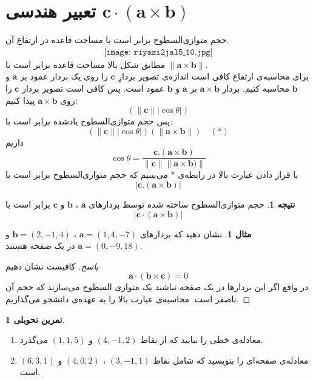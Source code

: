 \documentclass[12pt,a4paper]{article}
\theoremstyle{definition}
\newtheorem{mesal}[thm]{مثال}
\newtheorem{cor}[thm]{نتیجه}
\newtheorem{tamrinetahvili}{تمرین تحویلی}
\begin{document}
\section*{تعبیر هندسی $\mathbf{c} \cdot (\mathbf{a} \times \mathbf{b})$}
حجم متوازی‌السطوح برابر است با مساحت قاعده در ارتفاع آن.
\begin{align*}
\texttt{[image: riyazi2jal5\_10.jpg]}
\end{align*}
مطابق شکل بالا مساحت قاعده برابر است با
$\|\mathbf{a} \times \mathbf{b}\|$.
\\
برای محاسبه‌ی ارتفاع کافی است اندازه‌ی تصویر بردارِ 
$\mathbf{c}$
را روی یک بردار عمود بر 
$\mathbf{a}$
و 
$\mathbf{b}$
محاسبه کنیم.
بردار 
$\mathbf{a} \times \mathbf{b}$
بر 
$\mathbf{a}$
و 
$\mathbf{b}$
عمود است.
پس کافی است تصویر بردار
$\mathbf{c}$
را روی 
$\mathbf{a} \times \mathbf{b}$
پیدا کنیم:
\[
(\|\mathbf{c} \| |\cos \theta|)
\]
پس حجم متوازی‌السطوح یادشده برابر است با:
\[
(\|\mathbf{c} \| |\cos \theta|) (\|\mathbf{a} \times \mathbf{b}\|) \quad (*)
\]
داریم
\[
\cos \theta= \frac{\mathbf{c}.(\mathbf{a}\times\mathbf{b})}{\|\mathbf{c}\|\|\mathbf{a}\times\mathbf{b})\|}
\]
با قرار دادن عبارت بالا در رابطه‌ی
$*$
می‌بینیم که 
حجم متوازی‌السطوح برابر است با
\[|\mathbf{c}.(\mathbf{a}\times \mathbf{b})|\]
\begin{cor}
حجم متوازی‌السطوح ساخته شده توسط بردارهای 
$\mathbf{a}$
،
$\mathbf{b}$
و
$\mathbf{c}$
برابر است با
\[
|\mathbf{c}\cdot (\mathbf{a} \times \mathbf{b})|
\]
\end{cor}
\begin{mesal}
نشان دهید که بردارهای 
$\mathbf{a}=(1,4,-7)$
،
$\mathbf{b}=(2,-1,4)$
و
$\mathbf{a}=(0,-9,18)$
در یک صفحه هستند.
\end{mesal}
\begin{proof}[پاسخ]
کافیست نشان دهیم 
\[
\mathbf{a}\cdot (\mathbf{b} \times \mathbf{c})=0
\]
در واقع اگر این بردارها در یک صفحه نباشند یک متوازی السطوح می‌سازند که حجم آن ناصفر است. محاسبه‌ی عبارت بالا را به عهده‌ی دانشجو می‌گذاریم. 
\end{proof}
\begin{tamrinetahvili}
\hfill
\begin{enumerate}
\item
معادله‌ی خطی را بیابید که از نقاط 
$(4,-1,2)$
و
$(1,1,5)$
می‌گذرد.
\item
معادله‌ی صفحه‌ای را بنویسید که شامل نقاط 
$(3,-1,1)$
،
$(4,0,2)$
و
$(6,3,1)$
است.
\end{enumerate}
\end{tamrinetahvili}
\end{document}
